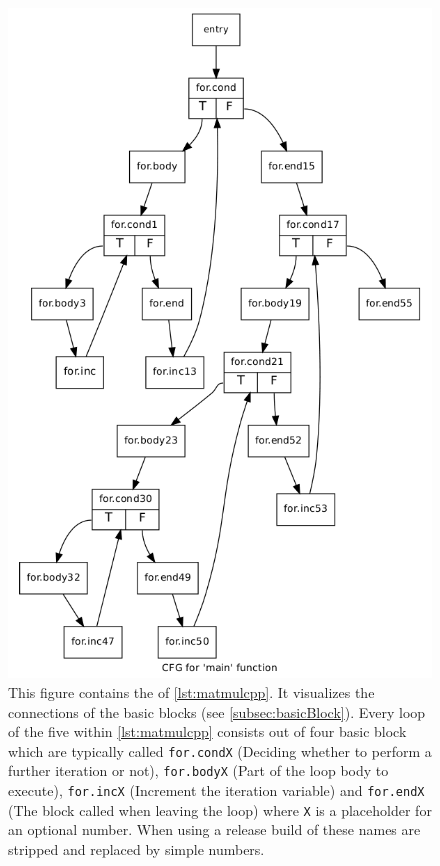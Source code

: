 \begin{figure}[!h]
    \caption[The CFG of \autoref{lst:matmulcpp}]{
        This figure contains the \cfg of \autoref{lst:matmulcpp}.
        It visualizes the connections of the basic blocks (see \autoref{subsec:basicBlock}).
        Every loop of the five within \autoref{lst:matmulcpp} consists out of four basic block which are typically called \texttt{for.condX} (Deciding whether to perform a further iteration or not), \texttt{for.bodyX} (Part of the loop body to execute), \texttt{for.incX} (Increment the iteration variable) and \texttt{for.endX} (The block called when leaving the loop) where \texttt{X} is a placeholder for an optional number.
        When using a release build of \llvm these names are stripped and replaced by simple numbers.
    }
    \label{fig:exampleCfg}
    \includegraphics[width=\textwidth]{gfx/matmulCfg.png}
\end{figure}
